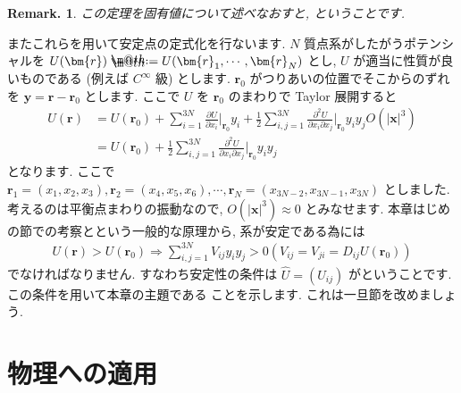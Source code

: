 \documentclass[openany, a4paper, oneside]{jsbook}
\makeatletter
\newcommand*{\defeq}{\mathrel{\rlap{%
\raisebox{0.3ex}{$\m@th\cdot$}}%
\raisebox{-0.3ex}{$\m@th\cdot$}}%
=}
\theoremstyle{break}
\theoremstyle{breakdefn}
\newtheorem{rem}[thm]{Remark.}
\makeatother
\begin{document}
\begin{rem}
この定理を固有値について述べなおすと,
ということです.
\label{rem:3.1}
\end{rem}

またこれらを用いて安定点の定式化を行ないます.
$N$ 質点系がしたがうポテンシャルを $U (\bm{r}) \defeq U ( \bm{r}_1,\dotsb,\bm{r}_N)$ とし,
$U$ が適当に性質が良いものである (例えば $C^{\infty}$ 級) とします.
$\bm{r}_0$ がつりあいの位置でそこからのずれを $\bm{y} = \bm{r} - \bm{r}_0$ とします.
ここで $U$ を $\bm{r}_0$ のまわりで Taylor 展開すると
\begin{align}
U ( \bm{r} )
&=
U ( \bm{r}_0 ) + \sum_{i=1}^{3N} \frac{\partial U} {\partial x_i} \bigg|_{\bm{r}_0} y_i
+\frac{1} {2} \sum_{i,j=1}^{3N} \frac{\partial^2 U} {\partial x_i \partial x_j}\bigg|_{\bm{r}_0} y_i y_j
O ( |\bm{x}|^3)\\
&=
U ( \bm{r}_0 ) + \frac{1} {2} \sum_{i,j=1}^{3N} \frac{\partial^2 U} {\partial x_i \partial x_j}\bigg|_{\bm{r}_0} y_i y_j
\end{align}
となります.
ここで $\bm{r}_1=(x_1,x_2,x_3),\bm{r}_2=(x_4,x_5,x_6),\dotsb,\bm{r}_N=(x_{3N-2},x_{3N-1},x_{3N})$ としました.
考えるのは平衡点まわりの振動なので,  $O ( |\bm{x}|^3) \approx 0$ とみなせます.
本章はじめの節での考察とという一般的な原理から,
系が安定である為には
\begin{align}
U ( \bm{r} )
>
U ( \bm{r}_0 )
\Longrightarrow \sum_{i,j=1}^{3N} V_{ij} y_i y_j > 0
\left ( V_{ij} = V_{j i} = D_{ij} U ( {\bm{r}_0}) \right)
\end{align}
でなければなりません.
すなわち安定性の条件は
 $\hat{U} = ( U_{ij})$ がということです.
この条件を用いて本章の主題である
ことを示します.
これは一旦節を改めましょう.
\section{物理への適用}
\end{document}

